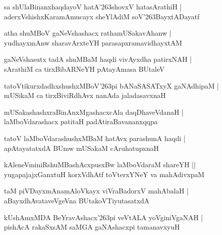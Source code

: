 \documentclass[twoside,12pt,openright]{book}
\def\S{\char'263}
\newcounter{shloka}[chapter]
\begin{document}
\begin{shloka}%
sa shUlaBinanxhaqdayoV hatA\S shovxV hatasArathiH |\\
aderxVshishxKaramAmucayx sheYlAdiM soV\S BayxtADayatf 
\end{shloka}

\begin{shloka}%
atha shuMBoV gaNeVshashacx rathamUSakavAhanw |\\
yudhayxmAnw sharavArxteYH parasapxramavidhayxtAM 
\end{shloka}

\begin{shloka}%
gaNeVshasutx tadA shuMBaM haqdi vivAyxdha patirxNAH |\\
sArathiM ca tirxBibARNeYH pAtayAmasa BUtaleV 
\end{shloka}

\begin{shloka}%
tatoVtikurxdadhxshushxMBoV\S pi bANaSASATxyX gaNAdhipaM |\\
mUSikaM ca tirxBiviRdhAvx nanAda jaladasavxnaH 
\end{shloka}

\begin{shloka}%
mUSakashashxraBinAnxMgashacxcAla daqDhaveVdanaH |\\
laMboVdarashacx patitaH padAtiraBavananxqqpa 
\end{shloka}

\begin{shloka}%
tatoV laMboVdarashushxMBaM hatAvx parashunA haqdi |\\
apAtayatatxdA BUmw mUSakaM cAruhatupxnaH 
\end{shloka}

\begin{shloka}%
kAleneVminiRshuMBashAcxpusxBw laMboVdaraM shareYH ||\\
yugapajajxGanxtuH korxVdhAtf toVterxYNeY va mahAdivxpaM 
\end{shloka}

\begin{shloka}%
taM piVDayxmAnamAloVkayx viVraBadorxV mahAbalaH |\\
aBayxdhAvataveVgeVna BUtakoVTiyutasatxdA 
\end{shloka}

\begin{shloka}%
kUshAmxMDA BeYravAshacx\S pi veVtALA yoVginiVgaNAH |\\
pishAcA rakaSxsAM saMGA gaNAshacxpi tamanavxyuH 
\end{shloka}
\end{document}
